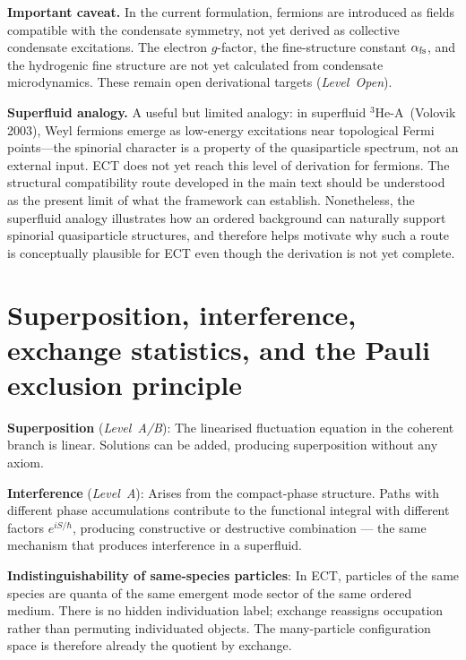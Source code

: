 \documentclass[11pt,a4paper]{article}
\begin{document}
\textbf{Important caveat.}
In the current formulation, fermions are introduced as fields compatible with the condensate symmetry, not yet derived as collective condensate excitations.
The electron $g$-factor, the fine-structure constant $\alpha_{\rm fs}$, and the hydrogenic fine structure are not yet calculated from condensate microdynamics.
These remain open derivational targets (\emph{Level~Open}).

\textbf{Superfluid analogy.}
A useful but limited analogy: in superfluid ${}^3$He-A~(Volovik 2003), Weyl fermions emerge as low-energy excitations near topological Fermi points---the spinorial character is a property of the quasiparticle spectrum, not an external input.
ECT does not yet reach this level of derivation for fermions.
The structural compatibility route developed in the main text should be understood as the present limit of what the framework can establish.
Nonetheless, the superfluid analogy illustrates how an ordered background can naturally support spinorial quasiparticle structures, and therefore helps motivate why such a route is conceptually plausible for ECT even though the derivation is not yet complete.


\section{Superposition, interference, exchange statistics, and the Pauli exclusion principle}

\textbf{Superposition} (\emph{Level~A/B}): The linearised fluctuation equation in the coherent branch is linear. Solutions can be added, producing superposition without any axiom.

\textbf{Interference} (\emph{Level~A}): Arises from the compact-phase structure. Paths with different phase accumulations contribute to the functional integral with different factors $e^{iS/\hbar}$, producing constructive or destructive combination --- the same mechanism that produces interference in a superfluid.

\textbf{Indistinguishability of same-species particles}: In ECT, particles of the same species are quanta of the same emergent mode sector of the same ordered medium. There is no hidden individuation label; exchange reassigns occupation rather than permuting individuated objects. The many-particle configuration space is therefore already the quotient by exchange.
\end{document}
